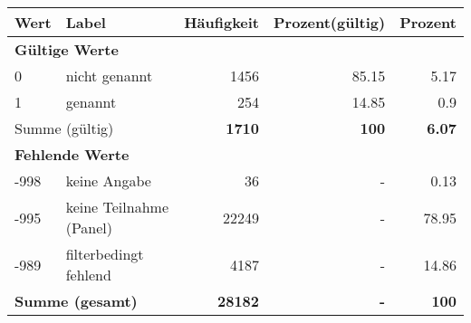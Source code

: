      \begin{longtable}{lXrrr}
     \toprule
     \textbf{Wert} & \textbf{Label} & \textbf{Häufigkeit} & \textbf{Prozent(gültig)} & \textbf{Prozent} \\
     \endhead
     \midrule
     \multicolumn{5}{l}{\textbf{Gültige Werte}}\\

     0 &
     \multicolumn{1}{X}{ nicht genannt   } &


       \num{1456} &
       \num[round-mode=places,round-precision=2]{85,15} &
         \num[round-mode=places,round-precision=2]{5,17} \\

     1 &
     \multicolumn{1}{X}{ genannt   } &


       \num{254} &
       \num[round-mode=places,round-precision=2]{14,85} &
         \num[round-mode=places,round-precision=2]{0,9} \\
     \midrule
     \multicolumn{2}{l}{Summe (gültig)} &
       \textbf{\num{1710}} &
     \textbf{100} &
       \textbf{\num[round-mode=places,round-precision=2]{6,07}} \\
     \multicolumn{5}{l}{\textbf{Fehlende Werte}}\\
       -998 &
       keine Angabe &
         \num{36} &
        - &
         \num[round-mode=places,round-precision=2]{0,13} \\
       -995 &
       keine Teilnahme (Panel) &
         \num{22249} &
        - &
         \num[round-mode=places,round-precision=2]{78,95} \\
       -989 &
       filterbedingt fehlend &
         \num{4187} &
        - &
         \num[round-mode=places,round-precision=2]{14,86} \\
     \midrule
     \multicolumn{2}{l}{\textbf{Summe (gesamt)}} &
          \textbf{\num{28182}} &
        \textbf{-} &
        \textbf{100} \\
     \bottomrule
     \end{longtable}
     
